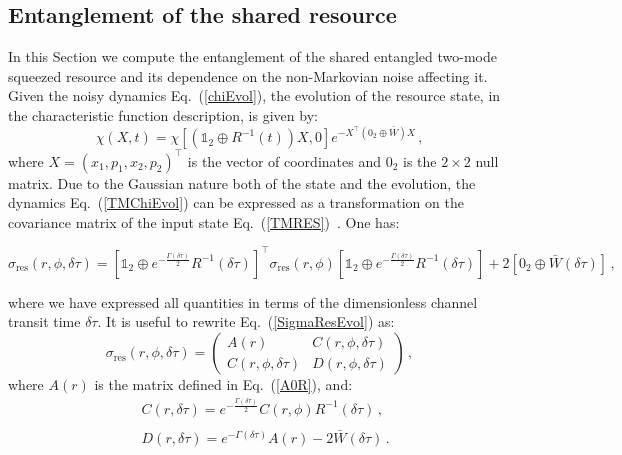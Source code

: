 \documentclass[prl,twocolumn,aps,floatfix,showpacs,tightenlines,superscriptaddress,amsmath,amssymb,amsfonts,10pt]{revtex4-1}
\begin{document}
\subsection{Entanglement of the shared resource}

In this Section we compute the entanglement of the shared entangled two-mode squeezed resource and its dependence on the non-Markovian noise affecting it.
Given the noisy dynamics Eq.~(\ref{chiEvol}), the evolution of the resource state, in the characteristic function description, is given by:
\begin{equation}\label{TMChiEvol}
	\chi(X,t)=\chi\left[(\mathbb{1}_2\oplus R^{-1}(t))X,0\right]e^{-X^\intercal(0_2\oplus\bar{W})X} \, ,
\end{equation}
where $X=(x_1,p_1,x_2,p_2)^\intercal$ is the vector of coordinates and $0_2$ is the $2\times 2$ null matrix. Due to the Gaussian nature both of the state and the evolution, the dynamics Eq.~(\ref{TMChiEvol}) can be expressed as a transformation on the covariance matrix of the input state Eq.~(\ref{TMRES})~\cite{EisWolf(2007)}. One has:
\begin{widetext}
\begin{equation}\label{SigmaResEvol}
	\sigma_{\textrm{res}}(r,\phi,\delta\tau)\!\!=\!\!\left[\mathbb{1}_2\oplus e^{-\frac{\Gamma(\delta\tau)}{2}}R^{-1}(\delta\tau)\right]^\intercal\!\!\sigma_{\textrm{res}}(r,\phi)\left[\mathbb{1}_2\oplus e^{-\frac{\Gamma(\delta\tau)}{2}}R^{-1}(\delta\tau)\right]\!\!+\!\!2\left[0_2\oplus\bar{W}(\delta\tau)\right] \, ,
\end{equation}
\end{widetext}
where we have expressed all quantities in terms of the dimensionless channel transit time $\delta \tau$.
It is useful to rewrite Eq.~(\ref{SigmaResEvol}) as:
\begin{equation}\label{SigEvolt}
\sigma_{\textrm{res}}(r,\phi,\delta\tau)=\left(\begin{array}{cc}
A(r) & C(r,\phi,\delta\tau)  \\
C(r,\phi,\delta\tau) & D(r,\phi,\delta\tau)
\end{array} \right) \, ,
\end{equation}
where $A(r)$ is the matrix defined in Eq.~(\ref{A0R}), and:
\begin{align}
	& C(r,\delta\tau)=e^{-\frac{\Gamma(\delta\tau)}{2}}C(r,\phi)R^{-1}(\delta\tau) \, ,\\
& \nonumber \\
	& D(r,\delta\tau)=e^{-\Gamma(\delta\tau)}A(r)-2\bar{W}(\delta\tau) \, .
\end{align}
\end{document}
